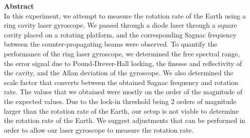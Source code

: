 \documentclass[a4paper]{report}
\numberwithin{equation}{section}
\begin{document}
\begin{titlepage}
	\vspace*{5em}

	\begin{minipage}{0.8\textwidth}
		\begin{centering}
			\textbf{Abstract}\\[0.2cm]
			In this experiment, we attempt to measure the rotation rate of the Earth using a ring cavity laser gyroscope. 
			We passed through a diode laser through a square cavity placed on a rotating platform, and the corresponding Sagnac frequency
			between the counter-propagating beams were observed. To quantify the performance of the ring laser 
			gyroscope, we determined the free spectral range, the error signal due to Pound-Drever-Hall locking, the finesse and 
			reflectivity of the cavity, and the Allan deviation of the gyroscope. We also determined the scale factor that converts between the obtained 
			Sagnac frequency and rotation rate. The values that we obtained were mostly on the order of the magnitude of the expected values. 
			Due to the lock-in threshold being 2 orders of magnitude larger than the rotation rate of the Earth, our setup is not 
			viable to determine the rotation rate of the Earth. We suggest adjustments that can be performed in order to 
			allow our laser gyroscope to measure the rotation rate.
		\end{centering}
	\end{minipage}
	
	
	
	
	
	
	 
	
	
\end{titlepage}
\end{document}
